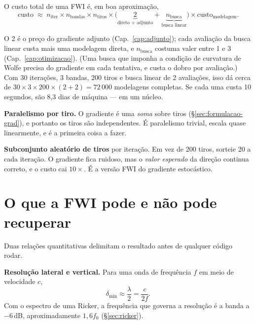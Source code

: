 \documentclass[11pt,a4paper,oneside]{report}
\begin{document}
O custo total de uma FWI \'e, em boa aproxima\c{c}\~ao,
\begin{equation}
\text{custo} \;\approx\;
n_{\text{iter}} \times n_{\text{bandas}} \times n_{\text{tiros}}
\times \bigl(\underbrace{2}_{\text{direto + adjunto}}
 + \underbrace{n_{\text{busca}}}_{\text{busca linear}}\bigr)
\times \text{custo}_{\text{modelagem}} .
\label{eq:custo}
\end{equation}

O 2 \'e o pre\c{c}o do gradiente adjunto (Cap.~\ref{cap:adjunto}); cada
avalia\c{c}\~ao da busca linear custa mais uma modelagem direta, e
$n_{\text{busca}}$ costuma valer entre 1 e 3 (Cap.~\ref{cap:otimizacao}). (Uma
busca que imponha a condi\c{c}\~ao de curvatura de Wolfe precisa do gradiente
em cada tentativa, e custa o dobro por avalia\c{c}\~ao.) Com 30
itera\c{c}\~oes, 3 bandas, 200 tiros e busca linear de 2 avalia\c{c}\~oes, isso
d\'a cerca de $30 \times 3 \times 200 \times (2+2) = 72\,000$ modelagens
completas. Se cada uma custa 10 segundos, s\~ao 8{,}3 dias de m\'aquina --- em
um n\'ucleo.

\begin{pratica}
\textbf{Paralelismo por tiro.} O gradiente \'e uma \emph{soma} sobre tiros
(§\ref{sec:formulacao-grad}), e portanto os tiros s\~ao independentes. \'E
paralelismo trivial, escala quase linearmente, e \'e a primeira coisa a fazer.

\textbf{Subconjunto aleat\'orio de tiros} por itera\c{c}\~ao. Em vez de 200
tiros, sorteie 20 a cada itera\c{c}\~ao. O gradiente fica ruidoso, mas o
\emph{valor esperado} da dire\c{c}\~ao continua correto, e o custo cai
$10\times$. \'E a vers\~ao FWI do gradiente estoc\'astico.
\end{pratica}

\section{O que a FWI pode e n\~ao pode recuperar}

Duas rela\c{c}\~oes quantitativas delimitam o resultado antes de qualquer
c\'odigo rodar.

\textbf{Resolu\c{c}\~ao lateral e vertical.} Para uma onda de frequ\^encia $f$
em meio de velocidade $c$,
\begin{equation}
\delta_{\min} \approx \frac{\lambda}{2} = \frac{c}{2f}.
\end{equation}
Com o espectro de uma Ricker, a frequ\^encia que governa a resolu\c{c}\~ao \'e
a banda a $-6$\,dB, aproximadamente $1{,}6 f_0$ (§\ref{sec:ricker}).
\end{document}
